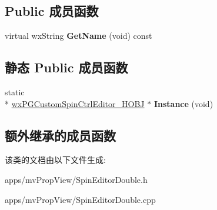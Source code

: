 \subsection*{Public 成员函数}
\begin{DoxyCompactItemize}
\item 
\hypertarget{classwx_p_g_custom_spin_ctrl_editor___h_o_b_j_ae7fda936e5a6426c80e017dd58e64767}{virtual wx\+String {\bfseries Get\+Name} (void) const }\label{classwx_p_g_custom_spin_ctrl_editor___h_o_b_j_ae7fda936e5a6426c80e017dd58e64767}

\end{DoxyCompactItemize}
\subsection*{静态 Public 成员函数}
\begin{DoxyCompactItemize}
\item 
\hypertarget{classwx_p_g_custom_spin_ctrl_editor___h_o_b_j_afe4d52fa6586241864fd3b18afc73167}{static \\*
\hyperlink{classwx_p_g_custom_spin_ctrl_editor___h_o_b_j}{wx\+P\+G\+Custom\+Spin\+Ctrl\+Editor\+\_\+\+H\+O\+B\+J} $\ast$ {\bfseries Instance} (void)}\label{classwx_p_g_custom_spin_ctrl_editor___h_o_b_j_afe4d52fa6586241864fd3b18afc73167}

\end{DoxyCompactItemize}
\subsection*{额外继承的成员函数}


该类的文档由以下文件生成\+:\begin{DoxyCompactItemize}
\item 
apps/mv\+Prop\+View/Spin\+Editor\+Double.\+h\item 
apps/mv\+Prop\+View/Spin\+Editor\+Double.\+cpp\end{DoxyCompactItemize}
